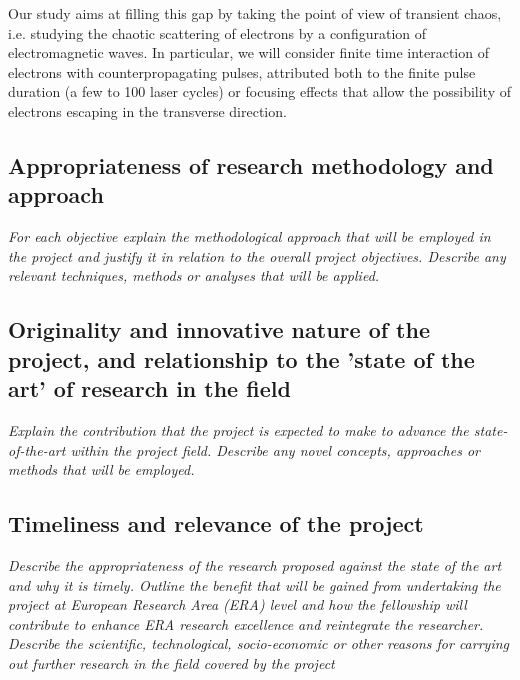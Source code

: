 \documentclass[a4paper,11pt]{article}
\newenvironment{xcomment}{\em}{}
\begin{document}
\begin{bibunit}
Our study aims at filling this gap by taking the point of view of transient chaos, i.e. studying
the chaotic scattering of electrons by a configuration of electromagnetic waves. In particular,
we will consider finite time interaction of electrons with counterpropagating pulses, attributed both
to the finite pulse duration (a few to 100 laser cycles) or focusing effects that allow the
possibility of electrons escaping in the transverse direction.

\subsection{Appropriateness of research methodology and approach}

\begin{xcomment}
For each objective explain the methodological approach that will be employed in the project and
justify it in relation to the overall project objectives. Describe any relevant techniques, methods or
analyses that will be applied.
\end{xcomment}

\subsection{Originality and innovative nature of the project, and relationship to the 'state of the art' of research in the field}

\begin{xcomment}
Explain the contribution that the project is expected to make to advance the state-of-the-art within
the project field. Describe any novel concepts, approaches or methods that will be employed.
\end{xcomment}

\subsection{Timeliness and relevance of the project}

\begin{xcomment}
Describe the appropriateness of the research proposed against the state of the art and why it is
timely. Outline the benefit that will be gained from undertaking the project at European Research
Area (ERA) level and how the fellowship will contribute to enhance ERA research excellence and
reintegrate the researcher. Describe the scientific, technological, socio-economic or other
reasons for carrying out further research in the field covered by the project
\end{xcomment}


\end{bibunit}
\end{document}
